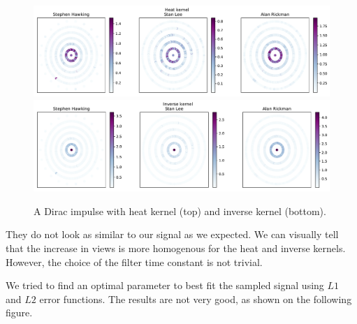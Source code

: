 \documentclass[conference]{IEEEtran}
\begin{document}
\begin{figure}[!htb]
\includegraphics[width=\linewidth]{heat_scatter.pdf}
\includegraphics[width=\linewidth]{inverse_scatter.pdf}
\caption{A Dirac impulse with heat kernel (top) and inverse kernel (bottom).} 
\end{figure}

They do not look as similar to our signal as we expected. We can visually tell that the increase in views is more homogenous for the heat and inverse kernels. However, the choice of the filter time constant is not trivial. 

\medskip

We tried to find an optimal parameter to best fit the sampled signal using $L1$ and $L2$ error functions. The results are not very good, as shown on the following figure. 
\end{document}
